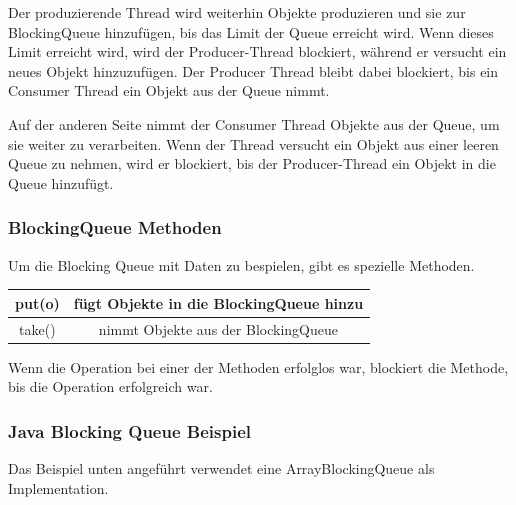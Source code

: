 Der produzierende Thread wird weiterhin Objekte produzieren und sie zur BlockingQueue hinzufügen, bis das Limit der Queue erreicht wird. Wenn dieses Limit erreicht wird, wird der Producer-Thread blockiert, während er versucht ein neues Objekt hinzuzufügen. Der Producer Thread bleibt dabei blockiert, bis ein Consumer Thread ein Objekt aus der Queue nimmt.
 
Auf der anderen Seite nimmt der Consumer Thread Objekte aus der Queue, um sie weiter zu verarbeiten. Wenn der Thread versucht ein Objekt aus einer leeren Queue zu nehmen, wird er blockiert, bis der Producer-Thread ein Objekt in die Queue hinzufügt. \cite{javaBlockingQueue}
 
\subsubsection{BlockingQueue Methoden}
Um die Blocking Queue mit Daten zu bespielen, gibt es spezielle Methoden.
 
\begin{center}
    \begin{tabular}{ |c|c| }
     \hline
     put(o) & fügt Objekte in die BlockingQueue hinzu \\
     \hline
     take() & nimmt Objekte aus der BlockingQueue \\
     \hline
    \end{tabular}
    \end{center}
 
Wenn die Operation bei einer der Methoden erfolglos war, blockiert die Methode, bis die Operation erfolgreich war. \cite{javaBlockingQueue}
 
\subsubsection{Java Blocking Queue Beispiel}
Das Beispiel unten angeführt verwendet eine ArrayBlockingQueue als Implementation.
 
 
 
